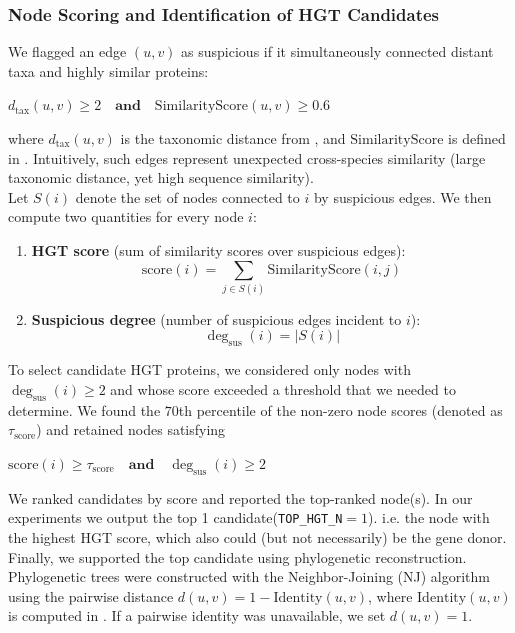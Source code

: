 \documentclass[11pt]{article}
\begin{document}
	\subsubsection[step 4]{Node Scoring and Identification of HGT Candidates}
	\label{subsubsec:step4}
	We flagged an edge $(u,v)$ as suspicious if it simultaneously connected distant taxa and highly similar proteins:
	\begin{center}
		$d_{\text{tax}}(u,v) \ge 2
		\quad\textbf{and}\quad
		\mathrm{SimilarityScore}(u,v) \ge 0.6$
	\end{center}
	where $d_{\text{tax}}(u,v)$ is the taxonomic distance from , and $\mathrm{SimilarityScore}$ is defined in .
	Intuitively, such edges represent unexpected cross-species similarity (large taxonomic distance, yet high sequence similarity).\\
	Let $S(i)$ denote the set of nodes connected to $i$ by suspicious edges.
	We then compute two quantities for every node $i$:
	\begin{enumerate}[noitemsep]
		\item \textbf{HGT score} (sum of similarity scores over suspicious edges):
		{\setlength{\abovedisplayskip}{4pt}
			\setlength{\belowdisplayskip}{4pt}
			\begin{equation*}
				\mathrm{score}(i) = \sum_{j \in S(i)} \mathrm{SimilarityScore}(i,j)
			\end{equation*}
		}
		\item \textbf{Suspicious degree} (number of suspicious edges incident to $i$):
		{\setlength{\abovedisplayskip}{4pt}
			\setlength{\belowdisplayskip}{4pt}
			\begin{equation*}
				\deg_{\text{sus}}(i) = |S(i)|
			\end{equation*}
		}
	\end{enumerate}
	To select candidate HGT proteins, we considered only nodes with $\deg_{\text{sus}}(i)\ge 2$ and whose score exceeded a threshold that we needed to determine.
	We found the $70$th percentile of the non-zero node scores (denoted as $\tau_{\text{score}}$) and retained nodes satisfying 
	\begin{center}
		$\mathrm{score}(i)\ge \tau_{\text{score}}
		\quad\textbf{and}\quad
		\deg_{\text{sus}}(i)\ge 2$
	\end{center}
	We ranked candidates by score and reported the top-ranked node(s). In our experiments we output the top 1 candidate(\texttt{TOP\_HGT\_N}$=1$). i.e. the node with the highest HGT score, which also could (but not necessarily) be the gene donor. \\
	Finally, we supported the top candidate using phylogenetic reconstruction.
	Phylogenetic trees were constructed with the Neighbor-Joining (NJ) algorithm \cite{NJ} using the pairwise distance $d(u,v)=1-\mathrm{Identity}(u,v)$, where $\mathrm{Identity}(u,v)$ is computed in . If a pairwise identity was unavailable, we set $d(u,v)=1$.
	
\end{document}
